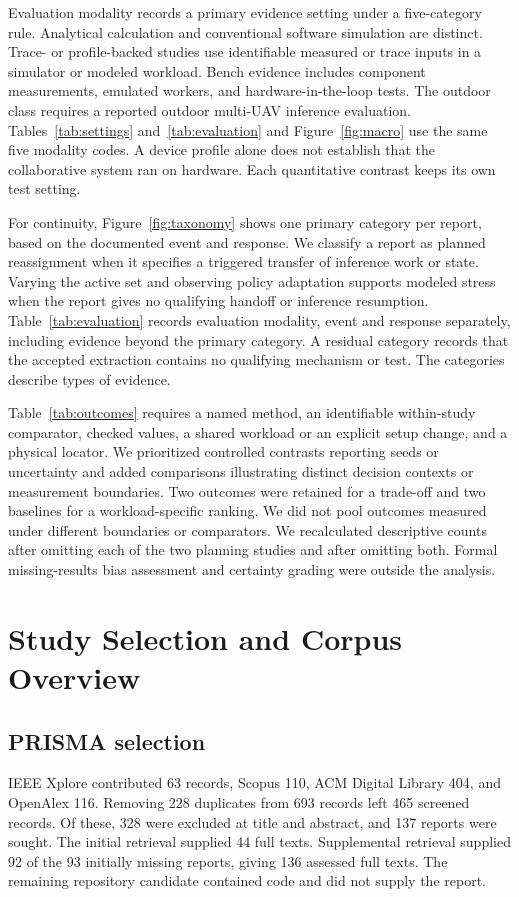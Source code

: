 \documentclass[pdflatex,sn-vancouver-num]{sn-jnl}
\begin{document}
Evaluation modality records a primary evidence setting under a five-category rule. Analytical calculation and conventional software simulation are distinct. Trace- or profile-backed studies use identifiable measured or trace inputs in a simulator or modeled workload. Bench evidence includes component measurements, emulated workers, and hardware-in-the-loop tests. The outdoor class requires a reported outdoor multi-UAV inference evaluation. Tables~\ref{tab:settings} and~\ref{tab:evaluation} and Figure~\ref{fig:macro} use the same five modality codes. A device profile alone does not establish that the collaborative system ran on hardware. Each quantitative contrast keeps its own test setting.

For continuity, Figure~\ref{fig:taxonomy} shows one primary category per report, based on the documented event and response. We classify a report as planned reassignment when it specifies a triggered transfer of inference work or state. Varying the active set and observing policy adaptation supports modeled stress when the report gives no qualifying handoff or inference resumption. Table~\ref{tab:evaluation} records evaluation modality, event and response separately, including evidence beyond the primary category. A residual category records that the accepted extraction contains no qualifying mechanism or test. The categories describe types of evidence.

Table~\ref{tab:outcomes} requires a named method, an identifiable within-study comparator, checked values, a shared workload or an explicit setup change, and a physical locator. We prioritized controlled contrasts reporting seeds or uncertainty and added comparisons illustrating distinct decision contexts or measurement boundaries. Two outcomes were retained for a trade-off and two baselines for a workload-specific ranking. We did not pool outcomes measured under different boundaries or comparators. We recalculated descriptive counts after omitting each of the two planning studies and after omitting both. Formal missing-results bias assessment and certainty grading were outside the analysis.

\section{Study Selection and Corpus Overview}\label{sec:selection}
\subsection{PRISMA selection}
IEEE Xplore contributed 63 records, Scopus 110, ACM Digital Library 404, and OpenAlex 116. Removing 228 duplicates from 693 records left 465 screened records. Of these, 328 were excluded at title and abstract, and 137 reports were sought. The initial retrieval supplied 44 full texts. Supplemental retrieval supplied 92 of the 93 initially missing reports, giving 136 assessed full texts. The remaining repository candidate contained code and did not supply the report.
\end{document}
